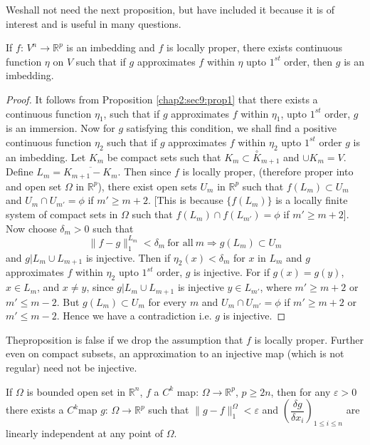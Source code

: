 We\pageoriginale shall not need the next proposition, but have included it because
it is of interest and is useful in many questions. 

\begin{proposition}\label{chap2:sec9:prop2}%
  If $f$: $V^n \to \mathbb{R}^p$ is an imbedding and $f$ is locally
  proper, there exists continuous function $\eta$ on $V$ such that if
  $g$ approximates $f$ within $\eta$ upto $1^{st}$ order, then $g$ is
  an imbedding. 
\end{proposition}

\begin{proof}
  It follows from Proposition \ref{chap2:sec9:prop1} that there exists a continuous
  function $\eta_1$, such that if $g$ approximates $f$ within $\eta_1$,
  upto $1^{st}$ order, $g$ is an immersion. Now for $g$ satisfying
  this condition, we shall find a positive continuous function
  $\eta_2$ such that if $g$ approximates $f$ within $\eta_2$ upto
  $1^{st}$ order $g$ is an imbedding. Let $K_m$ be compact sets such
  that $K_m \subset \overset{\circ}{K}_{m+1}$ and $\cup K_m=V$. Define $L_m =
  \overline {K_{m+1}-K_m}$. Then since $f$ is locally proper,
  (therefore proper into and open set $\Omega$ in $\mathbb{R}^p$),
  there exist open sets $U_m $ in $\mathbb{R}^p$ such that
  $f(L_m)\subset U_m $ and $U_m \cap U_{m'}=\phi$ if $m'\geq m+2$. [This
    is because $\{ f(L_m) \}$ is a locally finite system of compact
    sets in $\Omega$ such that $f(L_m)\cap f(L_{m'})=\phi$ if $m' \geq
    m+2$]. Now choose $\delta_m >0$ such that 
  $$
  \parallel f-g \parallel ^{L_m}_1 < \delta_m ~\text{for all}~ m
  \Rightarrow g(L_m)\subset U_m 
  $$
  and $g|L_m \cup L_{m+1}$ is injective. Then if $\eta _2 (x)< \delta
  _m$ for $x$ in $L_m$ and $g$ approximates $f$ within $\eta_2$ upto
  $1^{st}$ order, $g$ is injective. For if $g(x)=g(y)$, $x \in L_m$,
  and $x \neq y$, since $g| L_m \cup L_{m+1}$ is injective $y \in
  L_{m'}$, where $m' \geq m+2$ or $m' \leq m-2$. But $g(L_m)\subset U_m$
  for every $m$ and $U_m \cap U_{m'}=\phi$ if $m' \geq m+2$ or $m'
  \leq m-2$. Hence we have a contradiction i.e. $g$ is injective. 
\end{proof}

The\pageoriginale proposition is false if we drop the assumption that $f$ is locally
proper.  Further even on compact subsets, an approximation to an
injective map (which is not regular) need not be injective. 

\begin{lemma}\label{chap2:sec9:lem2}%
  If $\Omega$ is bounded open set in $\mathbb{R}^n$, $f$ a $C^k$ map:
  $\Omega \to \mathbb{R}^p$, $p\geq 2n$, then for any $\varepsilon >0$
  there exists a $C^k$map $g$: $\Omega \to \mathbb{R}^p$ such that
  $\parallel g-f \parallel^{\Omega}_1 < \varepsilon$ and
  $(\dfrac{\delta g}{\delta x_i})_{1 \leq i \leq n}$ are linearly
  independent at any point of $\Omega$. 
\end{lemma}


